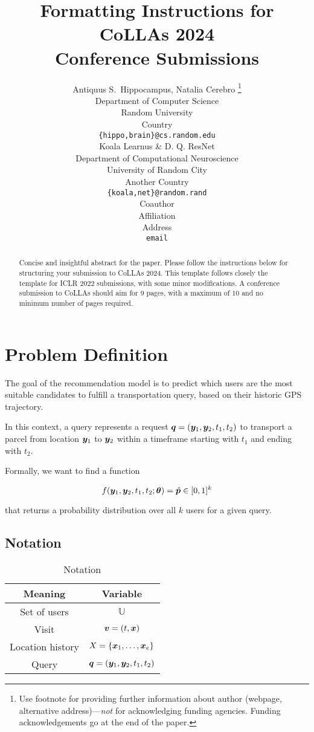 \documentclass{article} %
\title{Formatting Instructions for CoLLAs 2024 \\ Conference Submissions}
\author{Antiquus S.~Hippocampus, Natalia Cerebro  \thanks{ Use footnote for providing further information
about author (webpage, alternative address)---\emph{not} for acknowledging
funding agencies.  Funding acknowledgements go at the end of the paper.} \\
Department of Computer Science\\
Random University\\
Country \\
\texttt{\{hippo,brain\}@cs.random.edu} \\
\And %
Koala Learnus \& D. Q. ResNet  \\
Department of Computational Neuroscience \\
University of Random City \\
Another Country \\
\texttt{\{koala,net\}@random.rand} \\
\AND %
Coauthor \\
Affiliation \\
Address \\
\texttt{email}
}
\begin{document}
\maketitle

\begin{abstract}
    Concise and insightful abstract for the paper. Please follow the instructions below for structuring your submission to CoLLAs 2024. This template follows closely the template for ICLR 2022 submissions, with some minor modifications. A conference submission to CoLLAs should aim for 9 pages, with a maximum of 10 and no minimum number of pages required.
\end{abstract}


\section{Problem Definition}

The goal of the recommendation model is to predict which users are the most suitable candidates to fulfill a transportation query, based on their historic GPS trajectory.

In this context, a query represents a request ${\bm{q}} = ({\bm{y}}_1, {\bm{y}}_2, t_1, t_2)$ to transport a parcel from location ${\bm{y}}_1$ to ${\bm{y}}_2$ within a timeframe starting with $t_1$ and ending with $t_2$.

Formally, we want to find a function

\begin{equation}
    f({\bm{y}}_1, {\bm{y}}_2, t_1, t_2; {\bm{\theta}}) = \hat{{\bm{p}}} \in [0, 1]^{k}
\end{equation}

that returns a probability distribution over all $k$ users for a given query.


\subsection{Notation}

\begin{table}[h]
    \centering
    \begin{tabular}{c c}
        \toprule
        Meaning          & Variable                         \\
        \midrule
        Set of users     & $\mathbb{U}$                     \\
        Visit            & $\bm{v} = (t, {\bm{x}})$              \\
        Location history & $X = \{{\bm{x}}_1, \ldots, {\bm{x}}_e\}$   \\
        Query            & ${\bm{q}} = ({\bm{y}}_1, {\bm{y}}_2, t_1, t_2)$ \\
        \bottomrule
    \end{tabular}
    \caption{Notation}
\end{table}
\end{document}
